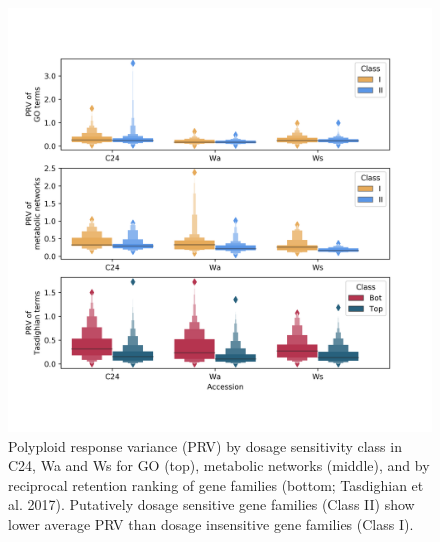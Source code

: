\documentclass[11pt]{article}
\begin{document}
\begin{figure}[h!]
    \includegraphics[width=\linewidth]{../figures/all_prv_boxen.png}
 \caption{Polyploid response variance (PRV) by dosage sensitivity class in C24, Wa and Ws for GO (top), metabolic networks (middle), and by reciprocal retention ranking of gene families (bottom; Tasdighian et al. 2017). Putatively dosage sensitive gene families (Class II) show lower average PRV than dosage insensitive gene families (Class I).}
  \label{fig3}
\end{figure}
\end{document}

